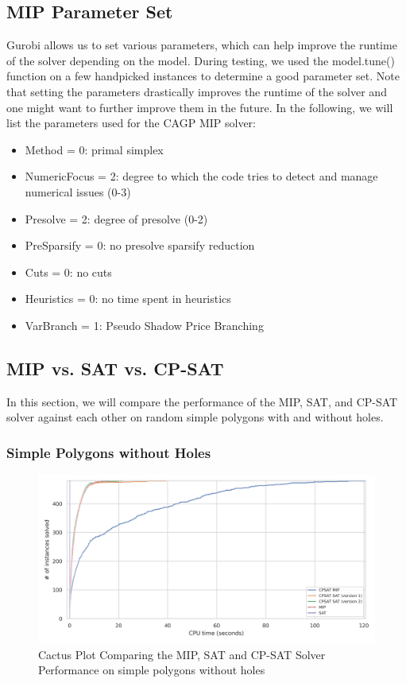 \subsection{MIP Parameter Set}
Gurobi allows us to set various parameters, which can help improve the runtime of the solver depending on the model. During testing, we used the model.tune() function on a few handpicked instances to determine a good parameter set. Note that setting the parameters drastically improves the runtime of the solver and one might want to further improve them in the future. In the following, we will list the parameters used for the CAGP MIP solver:
\begin{itemize}
  \item Method = 0: primal simplex
  \item NumericFocus = 2: degree to which the code tries to detect and manage numerical issues (0-3)
  \item Presolve = 2: degree of presolve (0-2)
  \item PreSparsify = 0: no presolve sparsify reduction
  \item Cuts = 0: no cuts
  \item Heuristics = 0: no time spent in heuristics
  \item VarBranch = 1: Pseudo Shadow Price Branching
\end{itemize}

\subsection{MIP vs. SAT vs. CP-SAT}
In this section, we will compare the performance of the MIP, SAT, and CP-SAT solver against each other on random simple polygons with and without holes.

\subsubsection{Simple Polygons without Holes}

\begin{figure}[htbp]
\centering
\includegraphics[scale=0.7]{Thesis/figures/final_benchmark_cactus_plot_runtime_MIP_SAT_CPSAT_without_holes.png}
\caption{Cactus Plot Comparing the MIP, SAT and CP-SAT Solver Performance on simple polygons without holes}
\label{fig:cactus_all_simple_no_holes}
\end{figure}

